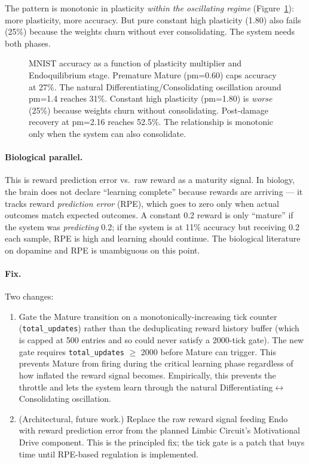 The pattern is monotonic in plasticity \emph{within the oscillating regime} (Figure~\ref{fig:plasticity_accuracy}): more plasticity, more accuracy. But pure constant high plasticity (1.80) also fails (25\%) because the weights churn without ever consolidating. The system needs both phases.

\begin{figure}[h]
  \centering
  \caption{MNIST accuracy as a function of plasticity multiplier and Endoquilibrium stage. Premature Mature (pm=0.60) caps accuracy at 27\%. The natural Differentiating/Consolidating oscillation around pm=1.4 reaches 31\%. Constant high plasticity (pm=1.80) is \emph{worse} (25\%) because weights churn without consolidating. Post-damage recovery at pm=2.16 reaches 52.5\%. The relationship is monotonic only when the system can also consolidate.}
  \label{fig:plasticity_accuracy}
\end{figure}

\paragraph{Biological parallel.}
This is reward prediction error vs.\ raw reward as a maturity signal. In biology, the brain does not declare ``learning complete'' because rewards are arriving --- it tracks reward \emph{prediction error} (RPE), which goes to zero only when actual outcomes match expected outcomes. A constant 0.2 reward is only ``mature'' if the system was \emph{predicting} 0.2; if the system is at 11\% accuracy but receiving 0.2 each sample, RPE is high and learning should continue. The biological literature on dopamine and RPE \cite{schultz1997neural} is unambiguous on this point.

\paragraph{Fix.}
Two changes:
\begin{enumerate}
  \item Gate the Mature transition on a monotonically-increasing tick counter (\texttt{total\_updates}) rather than the deduplicating reward history buffer (which is capped at 500 entries and so could never satisfy a 2000-tick gate). The new gate requires \texttt{total\_updates} $\geq$ 2000 before Mature can trigger. This prevents Mature from firing during the critical learning phase regardless of how inflated the reward signal becomes. Empirically, this prevents the throttle and lets the system learn through the natural Differentiating$\leftrightarrow$Consolidating oscillation.
  \item (Architectural, future work.) Replace the raw reward signal feeding Endo with reward prediction error from the planned Limbic Circuit's Motivational Drive component. This is the principled fix; the tick gate is a patch that buys time until RPE-based regulation is implemented.
\end{enumerate}

